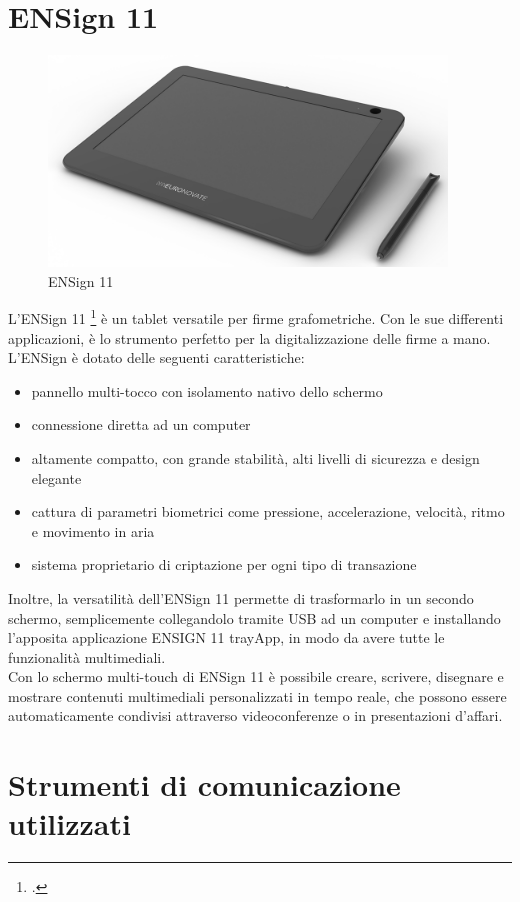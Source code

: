 \section{ENSign 11}

\begin{figure}[!h] 
    \centering 
    \includegraphics[width=300pt]{images/ensign11.png} 
    \caption{ENSign 11}
\end{figure}

L'ENSign 11 \footcite{site:ensign11}  è un tablet versatile per firme grafometriche. Con le sue differenti applicazioni, è lo strumento perfetto per la digitalizzazione delle firme a mano.\\
L'ENSign è dotato delle seguenti caratteristiche:
\begin{itemize}
    \item pannello multi-tocco con isolamento nativo dello schermo
    \item connessione diretta ad un computer
    \item altamente compatto, con grande stabilità, alti livelli di sicurezza e design elegante
    \item cattura di parametri biometrici come pressione, accelerazione, velocità, ritmo e movimento in aria
    \item sistema proprietario di criptazione per ogni tipo di transazione
\end{itemize}
Inoltre, la versatilità dell'ENSign 11 permette di trasformarlo in un secondo schermo, semplicemente collegandolo tramite USB ad un computer e installando l'apposita applicazione ENSIGN 11 trayApp, in modo da avere tutte le funzionalità multimediali.\\
Con lo schermo multi-touch di ENSign 11 è possibile creare, scrivere, disegnare e mostrare contenuti multimediali personalizzati in tempo reale, che possono essere automaticamente condivisi attraverso videoconferenze o in presentazioni d'affari.

\section{Strumenti di comunicazione utilizzati}

